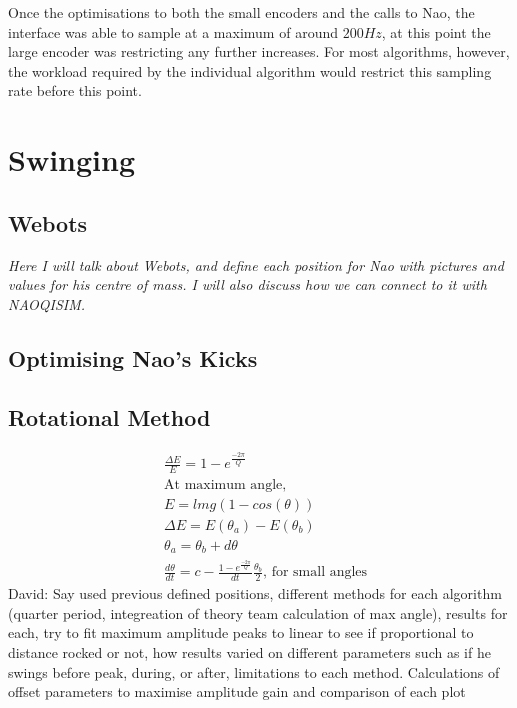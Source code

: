 \documentclass[11pt]{article}
\newcommand*\ruleline[1]{\par\noindent\raisebox{.8ex}{\makebox[\linewidth]{\hrulefill\hspace{1ex}\raisebox{-.8ex}{#1}\hspace{1ex}\hrulefill}}}
\begin{document}
Once the optimisations to both the small encoders and the calls to Nao, the interface was able to sample at a maximum of around $200Hz$, at this point the large encoder was restricting any further increases. For most algorithms, however, the workload required by the individual algorithm would restrict this sampling rate before this point. 

\section{Swinging}

\subsection{Webots}
\ruleline{James Doering}
\textit{Here I will talk about Webots, and define each position for Nao with pictures and values for his centre of mass. I will also discuss how we can connect to it with NAOQISIM.}

\subsection{Optimising Nao's Kicks}

\subsection{Rotational Method}

\begin{align}
    &\frac{\Delta E}{E} = 1 - e^{\frac{-2\pi}{Q}}\\
    &\text{At maximum angle},\\
    &E = lmg(1-cos(\theta))\\
    &\Delta E = E(\theta_a) - E(\theta_b)\\
    &\theta_a = \theta_b + d\theta\\
    &\frac{d\theta}{dt} = c - \frac{1-e^{\frac{-2\pi}{Q}}}{dt}\frac{\theta_b}{2}, \, \text{for small angles}
\end{align}
David: Say used previous defined positions, different methods for each algorithm (quarter period, integreation of theory team calculation of max angle), results for each, try to fit maximum amplitude peaks to linear to see if proportional to distance rocked or not, how results varied on different parameters such as if he swings before peak, during, or after, limitations to each method.
Calculations of offset parameters to maximise amplitude gain and comparison of each plot
\end{document}
